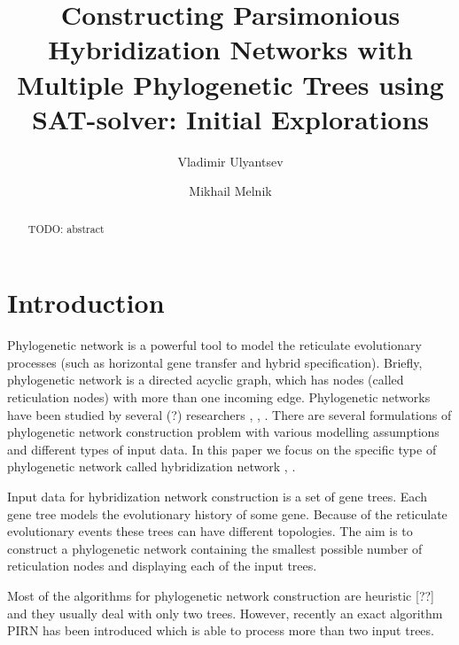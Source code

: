 \documentclass[runningheads, envcountsame, a4paper]{llncs}
\begin{document}
\mainmatter           
\title{Constructing Parsimonious Hybridization Networks with Multiple Phylogenetic Trees using SAT-solver: Initial Explorations}
\titlerunning{ } 
\toctitle{ }

\author{Vladimir Ulyantsev \and Mikhail Melnik}

\maketitle
\setcounter{footnote}{0}

\begin{abstract}
  TODO: abstract

\end{abstract}

\section{Introduction}

Phylogenetic network is a powerful tool to model the reticulate
evolutionary processes (such as horizontal gene transfer and hybrid specification).
Briefly, phylogenetic network is a directed acyclic graph, which has
nodes (called reticulation nodes) with more than one incoming edge. Phylogenetic
networks have been studied by several (?) researchers \cite{huson2010phylogenetic}, \cite{morrison2011introduction}, 
\cite{nakhleh2011evolutionary}. There are several formulations of phylogenetic network
construction problem with various modelling assumptions and different types of input data. 
In this paper we focus on the specific type of phylogenetic network called hybridization
network \cite{semple2006hybridization}, \cite{chen2010hybridnet}.

Input data for hybridization network construction is a set of gene trees. %
Each gene tree models the evolutionary history of some gene. %
Because of the reticulate evolutionary events these trees can have different topologies.
The aim is to construct a phylogenetic network
containing the smallest possible number of reticulation nodes and displaying each of the input trees. 

Most of the algorithms for phylogenetic network construction are heuristic [??] and they usually deal with only two trees.
However, recently an exact algorithm PIRN has been introduced \cite{wu2013algorithm} which is able to process more than two input trees.
\end{document}

